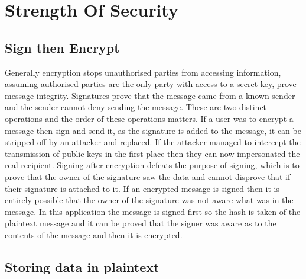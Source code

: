 
\chapter{Strength Of Security}
\label{stre}


\section{Sign then Encrypt}

Generally encryption stops unauthorised parties from accessing information, assuming authorised parties are the only party with access to a secret key, prove message integrity. Signatures prove that the message came from a known sender and the sender cannot deny sending the message. These are two distinct operations and the order of these operations matters. If a user was to encrypt a message then sign and send it, as the signature is added to the message, it can be stripped off by an attacker and replaced. If the attacker managed to intercept the transmission of public keys in the first place then they can now impersonated the real recipient. Signing after encryption defeats the purpose of signing, which is to prove that the owner of the signature saw the data and cannot disprove that if their signature is attached to it. If an encrypted message is signed then it is entirely possible that the owner of the signature was not aware what was in the message. In this application the message is signed first so the hash is taken of the plaintext message and it can be proved that the signer was aware as to the contents of the message and then it is encrypted\cite{signencrypt}.


\section{Storing data in plaintext}

